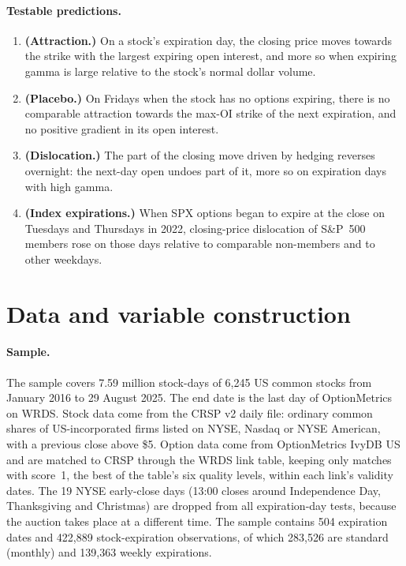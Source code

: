 \documentclass[11pt,a4paper]{article}
\begin{document}
\paragraph{Testable predictions.}
\begin{enumerate}
\item[\textbf{H1}] \textbf{(Attraction.)} On a stock's expiration day, the closing price moves towards the strike with the largest expiring open interest, and more so when expiring gamma is large relative to the stock's normal dollar volume.
\item[\textbf{H2}] \textbf{(Placebo.)} On Fridays when the stock has no options expiring, there is no comparable attraction towards the max-OI strike of the next expiration, and no positive gradient in its open interest.
\item[\textbf{H3}] \textbf{(Dislocation.)} The part of the closing move driven by hedging reverses overnight: the next-day open undoes part of it, more so on expiration days with high gamma.
\item[\textbf{H4}] \textbf{(Index expirations.)} When SPX options began to expire at the close on Tuesdays and Thursdays in 2022, closing-price dislocation of S\&P~500 members rose on those days relative to comparable non-members and to other weekdays.
\end{enumerate}

\section{Data and variable construction}

\paragraph{Sample.} The sample covers 7.59 million stock-days of 6,245 US common stocks from January 2016 to 29 August 2025. The end date is the last day of OptionMetrics on WRDS. Stock data come from the CRSP v2 daily file: ordinary common shares of US-incorporated firms listed on NYSE, Nasdaq or NYSE American, with a previous close above \$5. Option data come from OptionMetrics IvyDB US and are matched to CRSP through the WRDS link table, keeping only matches with score~1, the best of the table's six quality levels, within each link's validity dates. The 19 NYSE early-close days (13:00 closes around Independence Day, Thanksgiving and Christmas) are dropped from all expiration-day tests, because the auction takes place at a different time. The sample contains 504 expiration dates and 422,889 stock-expiration observations, of which 283,526 are standard (monthly) and 139,363 weekly expirations.
\end{document}
